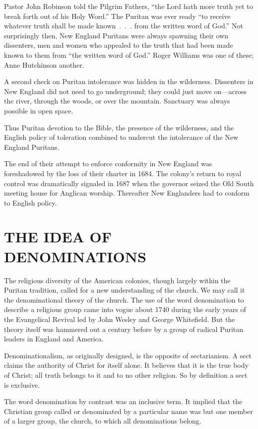 Pastor John Robinson told the Pilgrim Fathers, “the Lord hath more truth yet to break forth out of
his Holy Word.” The Puritan was ever ready “to receive whatever truth shall be made known~.~.~. from
the written word of God.” Not surprisingly then, New England Puritans were always spawning their own
dissenters, men and women who appealed to the truth that had been made known to them from “the
written word of God.” Roger Williams was one of these; Anne Hutchinson another.

A second check on Puritan intolerance was hidden in the wilderness. Dissenters in New England did
not need to go underground; they could just move on—across the river, through the woods, or over the
mountain. Sanctuary was always possible in open space.

Thus Puritan devotion to the Bible, the presence of the wilderness, and the English policy of
toleration combined to undercut the intolerance of the New England Puritans.

The end of their attempt to enforce conformity in New England was foreshadowed by the loss of their
charter in 1684. The colony’s return to royal control was dramatically signaled in 1687 when the
governor seized the Old South meeting house for Anglican worship. Thereafter New Englanders had to
conform to English policy.

\section{THE IDEA OF DENOMINATIONS}

The religious diversity of the American colonies, though largely within the Puritan tradition,
called for a new understanding of the church. We may call it the denominational theory of the
church. The use of the word denomination to describe a religious group came into vogue about 1740
during the early years of the Evangelical Revival led by John Wesley and George Whitefield. But the
theory itself was hammered out a century before by a group of radical Puritan leaders in England and
America.

Denominationalism, as originally designed, is the opposite of sectarianism. A sect claims the
authority of Christ for itself alone. It believes that it is the true body of Christ; all truth
belongs to it and to no other religion. So by definition a sect is exclusive.

The word denomination by contrast was an inclusive term. It implied that the Christian group called
or denominated by a particular name was but one member of a larger group, the church, to which all
denominations belong.

